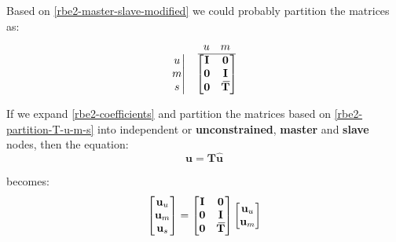 \documentclass[10pt,b5paper,titlepage]{book}
\newcommand{\m}{\mathbf}
\newcommand{\closure}[2][3]{%
{}\mkern#1mu\overline{\mkern-#1mu#2}}
\begin{document}
Based on \eqref{rbe2-master-slave-modified} we could probably partition
the matrices as:
\begin{equation}\label{rbe2-partition-T-u-m-s}
    \begin{matrix}
        \begin{matrix}
            \begin{matrix}
                \ 
            \end{matrix} \\
            \left. \begin{matrix}
                u \\
                m \\
                s \\
            \end{matrix} \right|
        \end{matrix}
        & \begin{matrix}
            \begin{matrix}
                u & m \\
                \hline
            \end{matrix} \\
            \begin{bmatrix}
                \m{I} & \m{0} \\
                \m{0} & \m{I} \\
                \m{0} & \m{\closure{T}} \\
            \end{bmatrix} \\
        \end{matrix}
    \end{matrix}
\end{equation}

If we expand \eqref{rbe2-coefficients} and partition the matrices
based on \eqref{rbe2-partition-T-u-m-s} into independent or
\textbf{unconstrained}, \textbf{master}
and \textbf{slave} nodes, then the equation:
\begin{equation}
    \m{u} = \m{T} \m{\hat{u}}
\end{equation}

becomes:
\begin{equation}
    \begin{bmatrix}
        \m{u}_u  \\
        \m{u}_m \\
        \m{u}_s \\
    \end{bmatrix}
    = \begin{bmatrix}
        \m{I} & \m{0} \\
        \m{0} & \m{I} \\
        \m{0} & \m{\closure{T}} \\
    \end{bmatrix}
    \begin{bmatrix}
        \m{u}_u \\
        \m{u}_m \\
    \end{bmatrix}
\end{equation}
\end{document}
